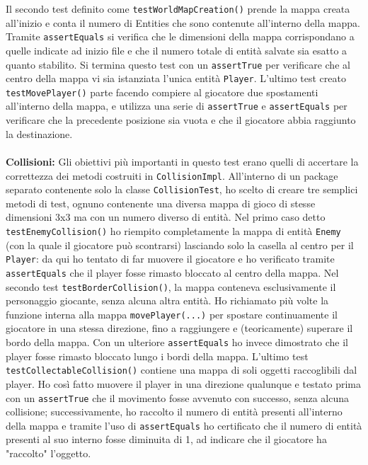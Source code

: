 \documentclass[a4paper,12pt]{report}
\begin{document}
Il secondo test definito come \verb|testWorldMapCreation()| prende la mappa creata all'inizio e conta il numero di Entities che sono contenute all'interno della mappa. Tramite \verb|assertEquals| si verifica che le dimensioni della mappa corrispondano a quelle indicate ad inizio file e che il numero totale di entità salvate sia esatto a quanto stabilito. Si termina questo test con un \verb|assertTrue| per verificare che al centro della mappa vi sia istanziata l'unica entità \verb|Player|.
L'ultimo test creato \verb|testMovePlayer()| parte facendo compiere al giocatore due spostamenti all'interno della mappa, e utilizza una serie di \verb|assertTrue| e \verb|assertEquals| per verificare che la precedente posizione sia vuota e che il giocatore abbia raggiunto la destinazione.
\\ \\
\textbf{Collisioni: }
Gli obiettivi più importanti in questo test erano quelli di accertare la correttezza dei metodi costruiti in \verb|CollisionImpl|. All'interno di un package separato contenente solo la classe \verb|CollisionTest|, ho scelto di creare tre semplici metodi di test, ognuno contenente una diversa mappa di gioco di stesse dimensioni 3x3 ma con un numero diverso di entità. Nel primo caso detto \verb|testEnemyCollision()| ho riempito completamente la mappa di entità \verb|Enemy| (con la quale il giocatore può scontrarsi) lasciando solo la casella al centro per il \verb|Player|: da qui ho tentato di far muovere il giocatore e ho verificato tramite \verb|assertEquals| che il player fosse rimasto bloccato al centro della mappa.
Nel secondo test \verb|testBorderCollision()|, la mappa conteneva esclusivamente il personaggio giocante, senza alcuna altra entità.
Ho richiamato più volte la funzione interna alla mappa \verb|movePlayer(...)| per spostare continuamente il giocatore in una stessa direzione, fino a raggiungere e (teoricamente) superare il bordo della mappa. Con un ulteriore \verb|assertEquals| ho invece dimostrato che il player fosse rimasto bloccato lungo i bordi della mappa.
L'ultimo test \verb|testCollectableCollision()| contiene una mappa di soli oggetti raccoglibili dal player. Ho così fatto muovere il player in una direzione qualunque e testato prima con un \verb|assertTrue| che il movimento fosse avvenuto con successo, senza alcuna collisione; successivamente, ho raccolto il numero di entità presenti all'interno della mappa e tramite l'uso di \verb|assertEquals| ho certificato che il numero di entità presenti al suo interno fosse diminuita di 1, ad indicare che il giocatore ha "raccolto" l'oggetto.
\end{document}
